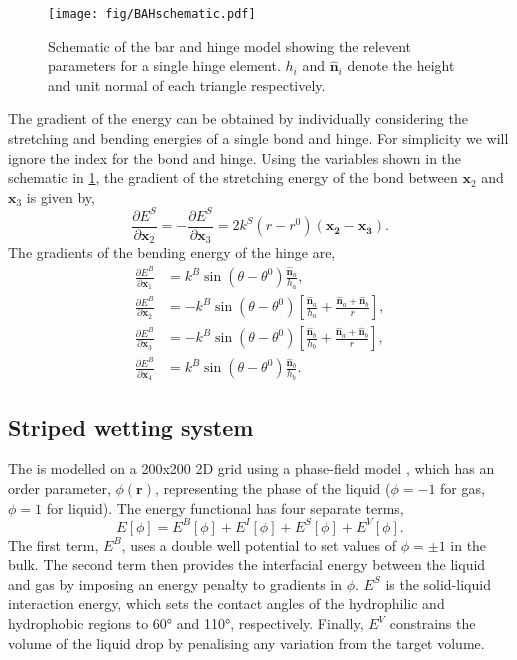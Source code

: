 \documentclass[twocolumn,10pt]{revtex4-2}
\begin{document}
\begin{figure}[htb]
  \texttt{[image: fig/BAHschematic.pdf]}
  \caption{\label{fig:BAHschematic}
    Schematic of the bar and hinge model showing the relevent parameters for a single hinge element. $h_i$ and $\bm{\hat{n}}_i$ denote the height and unit normal of each triangle respectively.
  }
\end{figure}
The gradient of the energy can be obtained by individually considering the stretching and bending energies of a single bond and hinge.
For simplicity we will ignore the index for the bond and hinge.
Using the variables shown in the schematic in \cref{fig:BAHschematic}, the gradient of the stretching energy of the bond between $\bm{x}_2$ and $\bm{x}_3$ is given by,
\begin{equation}
  \frac{\partial E^S}{\partial \bm{x}_2} = - \frac{\partial E^S}{\partial \bm{x}_3} = 
    2 k^S (r - r^0) (\bm{x_2} - \bm{x_3}).
\end{equation}
The gradients of the bending energy of the hinge are,
\begin{align}
  \frac{\partial E^B}{\partial \bm{x}_1} &= k^B \sin(\theta - \theta^0) \frac{\bm{\hat{n}}_a}{h_a}, \\
  \frac{\partial E^B}{\partial \bm{x}_2} &= - k^B \sin(\theta - \theta^0) \left[\frac{\bm{\hat{n}}_a}{h_a} + \frac{\bm{\hat{n}}_a + \bm{\hat{n}}_b}{r}\right], \\
  \frac{\partial E^B}{\partial \bm{x}_3} &= - k^B \sin(\theta - \theta^0) \left[\frac{\bm{\hat{n}}_b}{h_b} + \frac{\bm{\hat{n}}_a + \bm{\hat{n}}_b}{r}\right], \\
  \frac{\partial E^B}{\partial \bm{x}_4} &= k^B \sin(\theta - \theta^0) \frac{\bm{\hat{n}}_b}{h_b}.
\end{align}

\subsection{Striped wetting system}
The  is modelled on a 200x200 2D grid using a phase-field model \cite{Panter2019b}, which has an order parameter, $\phi(\bm{r})$, representing the phase of the liquid ($\phi=-1$ for gas, $\phi=1$ for liquid).
The energy functional has four separate terms,
\begin{equation} \label{eq:phasefield}
  E[\phi] = E^B[\phi] + E^I[\phi] + E^S[\phi] + E^V[\phi].
\end{equation}
The first term, $E^B$, uses a double well potential to set values of $\phi=\pm1$ in the bulk.
The second term then provides the interfacial energy between the liquid and gas by imposing an energy penalty to gradients in $\phi$.
$E^S$ is the solid-liquid interaction energy, which sets the contact angles of the hydrophilic and hydrophobic regions to 60\si{\degree} and 110\si{\degree}, respectively.
Finally, $E^V$ constrains the volume of the liquid drop by penalising any variation from the target volume.
\end{document}
